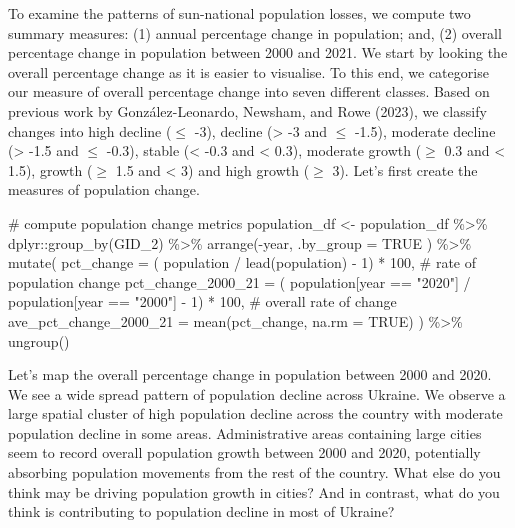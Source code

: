\documentclass[
  letterpaper,
  DIV=11,
  numbers=noendperiod]{scrreprt}
\newenvironment{Shaded}{\begin{snugshade}}{\end{snugshade}}
\newcommand{\AttributeTok}[1]{\textcolor[rgb]{0.40,0.45,0.13}{#1}}
\newcommand{\CommentTok}[1]{\textcolor[rgb]{0.37,0.37,0.37}{#1}}
\newcommand{\ConstantTok}[1]{\textcolor[rgb]{0.56,0.35,0.01}{#1}}
\newcommand{\DecValTok}[1]{\textcolor[rgb]{0.68,0.00,0.00}{#1}}
\newcommand{\FunctionTok}[1]{\textcolor[rgb]{0.28,0.35,0.67}{#1}}
\newcommand{\NormalTok}[1]{\textcolor[rgb]{0.00,0.23,0.31}{#1}}
\newcommand{\OtherTok}[1]{\textcolor[rgb]{0.00,0.23,0.31}{#1}}
\newcommand{\SpecialCharTok}[1]{\textcolor[rgb]{0.37,0.37,0.37}{#1}}
\newcommand{\StringTok}[1]{\textcolor[rgb]{0.13,0.47,0.30}{#1}}
\begin{document}
To examine the patterns of sun-national population losses, we compute
two summary measures: (1) annual percentage change in population; and,
(2) overall percentage change in population between 2000 and 2021. We
start by looking the overall percentage change as it is easier to
visualise. To this end, we categorise our measure of overall percentage
change into seven different classes. Based on previous work by
González-Leonardo, Newsham, and Rowe (2023), we classify changes into
high decline (\(\leq\) -3), decline (\textgreater{} -3 and \(\leq\)
-1.5), moderate decline (\textgreater{} -1.5 and \(\leq\) -0.3), stable
(\textless{} -0.3 and \textless{} 0.3), moderate growth (\(\geq\) 0.3
and \textless{} 1.5), growth (\(\geq\) 1.5 and \textless{} 3) and high
growth (\(\geq\) 3). Let's first create the measures of population
change.

\begin{Shaded}
\begin{Highlighting}[]
\CommentTok{\# compute population change metrics}
\NormalTok{population\_df }\OtherTok{\textless{}{-}}\NormalTok{ population\_df }\SpecialCharTok{\%\textgreater{}\%} 
\NormalTok{  dplyr}\SpecialCharTok{::}\FunctionTok{group\_by}\NormalTok{(GID\_2) }\SpecialCharTok{\%\textgreater{}\%} 
  \FunctionTok{arrange}\NormalTok{(}\SpecialCharTok{{-}}\NormalTok{year, }\AttributeTok{.by\_group =} \ConstantTok{TRUE}\NormalTok{ ) }\SpecialCharTok{\%\textgreater{}\%} 
  \FunctionTok{mutate}\NormalTok{(}
  \AttributeTok{pct\_change =}\NormalTok{ ( population }\SpecialCharTok{/} \FunctionTok{lead}\NormalTok{(population) }\SpecialCharTok{{-}} \DecValTok{1}\NormalTok{) }\SpecialCharTok{*} \DecValTok{100}\NormalTok{, }\CommentTok{\# rate of population change}
  \AttributeTok{pct\_change\_2000\_21 =}\NormalTok{ ( population[year }\SpecialCharTok{==} \StringTok{"2020"}\NormalTok{] }\SpecialCharTok{/}\NormalTok{ population[year }\SpecialCharTok{==} \StringTok{"2000"}\NormalTok{] }\SpecialCharTok{{-}} \DecValTok{1}\NormalTok{) }\SpecialCharTok{*} \DecValTok{100}\NormalTok{, }\CommentTok{\# overall rate of change}
  \AttributeTok{ave\_pct\_change\_2000\_21 =} \FunctionTok{mean}\NormalTok{(pct\_change, }\AttributeTok{na.rm =} \ConstantTok{TRUE}\NormalTok{)}
\NormalTok{) }\SpecialCharTok{\%\textgreater{}\%} 
  \FunctionTok{ungroup}\NormalTok{()}
\end{Highlighting}
\end{Shaded}

Let's map the overall percentage change in population between 2000 and
2020. We see a wide spread pattern of population decline across Ukraine.
We observe a large spatial cluster of high population decline across the
country with moderate population decline in some areas. Administrative
areas containing large cities seem to record overall population growth
between 2000 and 2020, potentially absorbing population movements from
the rest of the country. What else do you think may be driving
population growth in cities? And in contrast, what do you think is
contributing to population decline in most of Ukraine?
\end{document}
